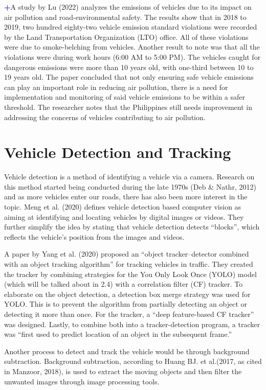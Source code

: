 \textcolor{blue}{\textbf{+}}A study by Lu (2022) analyzes the emissions of vehicles due to its impact on air pollution and road-environmental safety. The results show that in 2018 to 2019, two hundred eighty-two vehicle emission standard violations were recorded by the Land Transportation Organization (LTO) office. All of these violations were due to smoke-belching from vehicles. Another result to note was that all the violations were during work hours (6:00 AM to 5:00 PM). The vehicles caught for dangerous emissions were more than 10 years old, with one-third between 10 to 19 years old. The paper concluded that not only ensuring safe vehicle emissions can play an important role in reducing air pollution, there is a need for implementation and monitoring of said vehicle emissions to be within a safer threshold. The researcher notes that the Philippines still needs improvement in addressing the concerns of vehicles contributing to air pollution.


\section{Vehicle Detection and Tracking}

	Vehicle detection is a method of identifying a vehicle via a camera. Research on this method started being conducted during the late 1970s (Deb \& Nathr, 2012) and as more vehicles enter our roads, there has also been more interest in the topic.  Meng et al. (2020) defines vehicle detection based computer vision as aiming at identifying and locating vehicles by digital images or videos. They further simplify the idea by stating that vehicle detection detects “blocks”, which reflects the vehicle’s position from the images and videos.

	A paper by Yang et al. (2020) proposed an “object tracker–detector combined with an object tracking algorithm” for tracking vehicles in traffic. They created the tracker by combining strategies for the You Only Look Once (YOLO) model (which will be talked about in 2.4) with a correlation filter (CF) tracker. To elaborate on the object detection, a detection box merge strategy was used for YOLO. This is to prevent the algorithm from partially detecting an object or detecting it more than once. For the tracker, a “deep feature-based CF tracker” was designed. Lastly, to combine both into a tracker-detection program, a tracker was “first used to predict location of an object in the subsequent frame.”

	Another process to detect and track the vehicle would be through background subtraction. Background subtraction, according to Huang BJ. et al.(2017, as cited in Manzoor, 2018), is used to extract the moving objects and then filter the unwanted images through image processing tools. 
	
